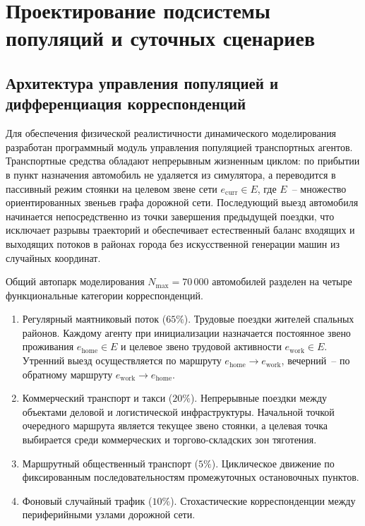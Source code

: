 \chapter{Проектирование подсистемы популяций и суточных сценариев}
\label{chap:population}

\section{Архитектура управления популяцией и дифференциация корреспонденций}
\label{sec:population_arch}

Для обеспечения физической реалистичности динамического моделирования разработан программный модуль управления популяцией транспортных агентов. Транспортные средства обладают непрерывным жизненным циклом: по прибытии в пункт назначения автомобиль не удаляется из симулятора, а переводится в пассивный режим стоянки на целевом звене сети $e_{\text{curr}} \in E$, где $E$~-- множество ориентированных звеньев графа дорожной сети. Последующий выезд автомобиля начинается непосредственно из точки завершения предыдущей поездки, что исключает разрывы траекторий и обеспечивает естественный баланс входящих и выходящих потоков в районах города без искусственной генерации машин из случайных координат.

Общий автопарк моделирования $N_{\max} = 70\,000$ автомобилей разделен на четыре функциональные категории корреспонденций.
\begin{enumerate}
    \item Регулярный маятниковый поток ($65\%$). Трудовые поездки жителей спальных районов. Каждому агенту при инициализации назначается постоянное звено проживания $e_{\text{home}} \in E$ и целевое звено трудовой активности $e_{\text{work}} \in E$. Утренний выезд осуществляется по маршруту $e_{\text{home}} \to e_{\text{work}}$, вечерний~-- по обратному маршруту $e_{\text{work}} \to e_{\text{home}}$.
    \item Коммерческий транспорт и такси ($20\%$). Непрерывные поездки между объектами деловой и логистической инфраструктуры. Начальной точкой очередного маршрута является текущее звено стоянки, а целевая точка выбирается среди коммерческих и торгово-складских зон тяготения.
    \item Маршрутный общественный транспорт ($5\%$). Циклическое движение по фиксированным последовательностям промежуточных остановочных пунктов.
    \item Фоновый случайный трафик ($10\%$). Стохастические корреспонденции между периферийными узлами дорожной сети.
\end{enumerate}

